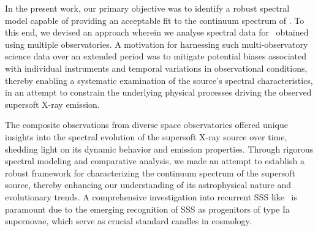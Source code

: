 		In the present work, our primary objective was to identify a robust spectral model capable of providing an acceptable fit to the continuum spectrum of \source. To this end, we devised an approach wherein we analyse spectral data for \source\ obtained using multiple observatories. A motivation for harnessing such multi-observatory science data over an extended period was to mitigate potential biases associated with individual instruments and temporal variations in observational conditions, thereby enabling a systematic examination of the source's spectral characteristics, in an attempt to constrain the underlying physical processes driving the observed supersoft X-ray emission.
		
		The composite observations from diverse space observatories offered unique insights into the spectral evolution of the supersoft X-ray source over time, shedding light on its dynamic behavior and emission properties. Through rigorous spectral modeling and comparative analysis, we made an attempt to establish a robust framework for characterizing the continuum spectrum of the supersoft source, thereby enhancing our understanding of its astrophysical nature and evolutionary trends. A comprehensive investigation into recurrent SSS like \source\ is paramount due to the emerging recognition of SSS as progenitors of type Ia supernovae, which serve as crucial standard candles in cosmology. %
    
